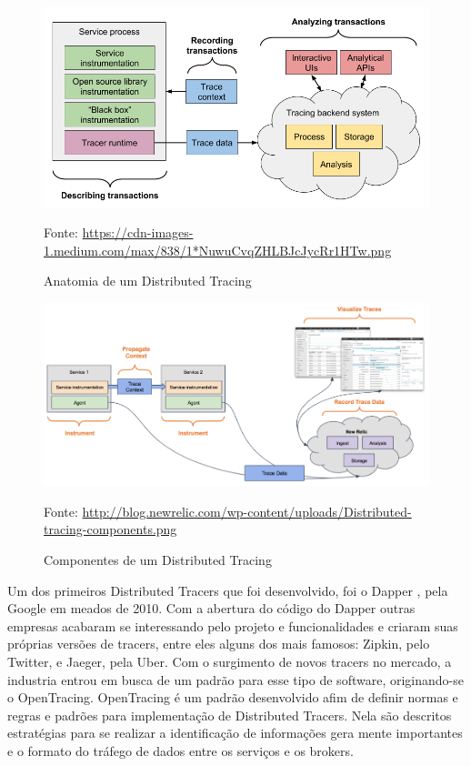 \documentclass[twosideprint]{politex}
\newcommand{\legend}[1]{\begin{center}\def\caption{}\caption{#1}\end{center}}
\begin{document}
	\begin{figure}[htb]
		\caption{\label{fig_tracing_concept}Anatomia de um Distributed Tracing}
		\begin{center}
		\includegraphics[scale=0.5]{pictures/tracing_concept.png}
		\end{center}
		\legend{Fonte: \url{https://cdn-images-1.medium.com/max/838/1*NuwuCvqZHLBJcJycRr1HTw.png}}
	\end{figure}
	
	\begin{figure}[htb]
		\caption{\label{fig_tracing_components}Componentes de um Distributed Tracing}
		\begin{center}
		\includegraphics[scale=0.95]{pictures/distributed-tracing-components.png}
		\end{center}
		\legend{Fonte: \url{http://blog.newrelic.com/wp-content/uploads/Distributed-tracing-components.png}}
	\end{figure}
	
	Um dos primeiros Distributed Tracers que foi desenvolvido, foi o Dapper \cite{googledapper}, pela Google em meados de 2010. Com a abertura do código do Dapper outras empresas acabaram se interessando pelo projeto e funcionalidades e criaram suas próprias versões de tracers, entre eles alguns dos mais famosos: Zipkin\cite{zipkin}, pelo Twitter, e Jaeger\cite{jaegerarch}, pela Uber. Com o surgimento de novos tracers no mercado, a industria entrou em busca de um padrão para esse tipo de software, originando-se o OpenTracing\cite{opentracing}. OpenTracing é um padrão desenvolvido afim de definir normas e regras e padrões para implementação de Distributed Tracers. Nela são descritos estratégias para se realizar a identificação de informações gera mente importantes e o formato do tráfego de dados entre os serviços e os brokers.
	
\end{document}
